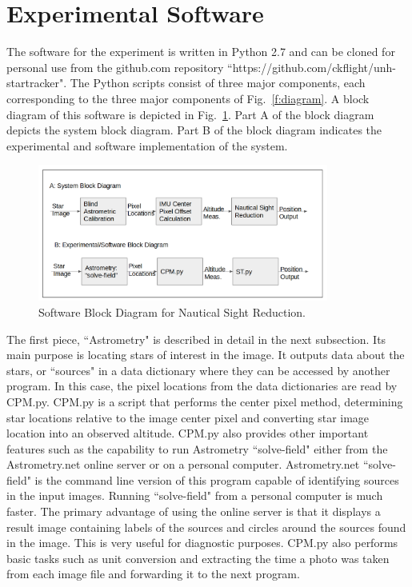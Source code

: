 \documentclass[12pt,a4paper]{book}
\begin{document}
\section{Experimental Software}
The software for the experiment is written in Python 2.7 and can be cloned for personal use from the github.com repository ``https://github.com/ckflight/unh-startracker".  The Python scripts consist of three major components, each corresponding to the three major components of Fig.~\ref{f:diagram}.  A block diagram of this software is depicted in Fig.~\ref{f:software}.  Part A of the block diagram depicts the system block diagram.  Part B of the block diagram indicates the experimental and software implementation of the system.
\begin{figure}[!ht]%
\centering
 \includegraphics[height=4.5cm]{software.png}
 \caption{Software Block Diagram for Nautical Sight Reduction.}
\label{f:software}
\end{figure} 
The first piece, ``Astrometry" is described in detail in the next subsection. Its main purpose is locating stars of interest in the image.  It outputs data about the stars, or ``sources" in a data dictionary where they can be accessed by another program. In this case, the pixel locations from the data dictionaries are read by CPM.py.  CPM.py is a script that performs the center pixel method, determining star locations relative to the image center pixel and converting star image location into an observed altitude.  CPM.py also provides other important features such as the capability to run Astrometry ``solve-field" either from the Astrometry.net online server or on a personal computer.  Astrometry.net ``solve-field" is the command line version of this program capable of identifying sources in the input images.  Running ``solve-field" from a personal computer is much faster.  The primary advantage of using the online server is that it displays a result image containing labels of the sources and circles around the sources found in the image.  This is very useful for diagnostic purposes.  CPM.py also performs basic tasks such as unit conversion and extracting the time a photo was taken from each image file   and forwarding it to the next program.  
\end{document}
